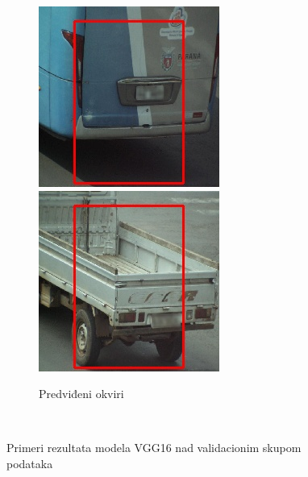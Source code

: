 \documentclass[12pt,oneside]{memoir}
\begin{document}
\begin{figure}
\begin{subfigure}[b]{0.35\textwidth}
        \includegraphics[width=\textwidth]{matfmaster/vgg16_base/bus_pred.jpg}
        \includegraphics[width=\textwidth]{matfmaster/vgg16_base/truck_pred.jpg}
        \caption{Predviđeni okviri}
    \end{subfigure}
    ~
    \caption{Primeri rezultata modela VGG16 nad validacionim skupom podataka}
    \label{fig:section4_vgg16prediction}
\end{figure}
\end{document}
